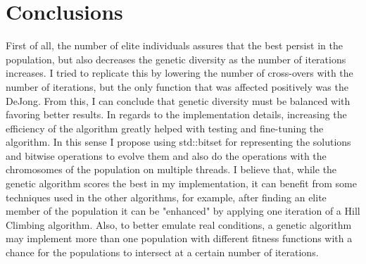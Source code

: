 \documentclass{report}
\begin{document}
\section*{Conclusions}
First of all, the number of elite individuals assures that the best persist in the population, but also decreases the genetic diversity as the number of iterations increases. 
\newline
\newline
I tried to replicate this by lowering the number of cross-overs with the number of iterations, but the only function that was affected positively was the DeJong. From this, I can conclude that genetic diversity must be balanced with favoring better results.
\newline
\newline
In regards to the implementation details, increasing the efficiency of the algorithm greatly helped with testing and fine-tuning the algorithm.
In this sense I propose using std::bitset for representing the solutions and bitwise operations to evolve them and also do the operations with the chromosomes of the population on multiple threads.
\newline
\newline
\newline
\newline
\newline
\newline
\newline
\newline
\newline
I believe that, while the genetic algorithm scores the best in my implementation, it can benefit from some techniques used in the other algorithms, for example, after finding an elite member of the population it can be "enhanced" by applying one iteration of a Hill Climbing algorithm.
Also, to better emulate real conditions, a genetic algorithm may implement more than one population with different fitness functions with a chance for the populations to intersect at a certain number of iterations.
\end{document}
